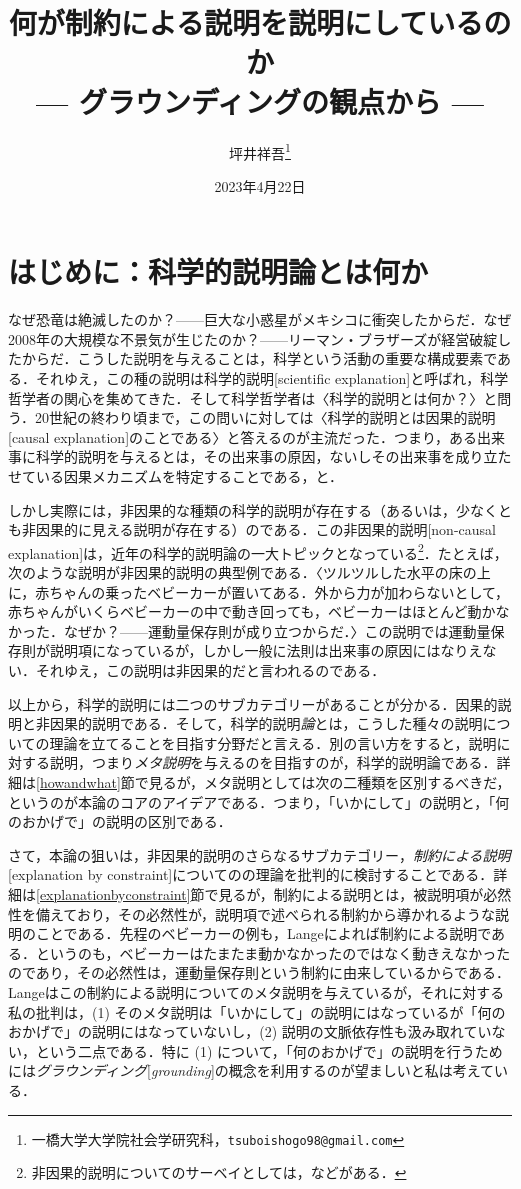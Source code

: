 \documentclass[dvipdfmx,twoside,11pt,uplatex]{jsarticle}
\title{何が制約による説明を説明にしているのか
\large{\\--- グラウンディングの観点から ---}
}
\author{坪井祥吾\thanks{一橋大学大学院社会学研究科，\texttt{tsuboishogo98@gmail.com}}}
\date{2023年4月22日}
\newcommand{\myterm}[2]{{\emph{#1}}{[\emph{#2}]}}
\theoremstyle{definition}
\begin{document}
\maketitle

\section{はじめに：科学的説明論とは何か}
なぜ恐竜は絶滅したのか？——巨大な小惑星がメキシコに衝突したからだ．なぜ2008年の大規模な不景気が生じたのか？——リーマン・ブラザーズが経営破綻したからだ．こうした説明を与えることは，科学という活動の重要な構成要素である．それゆえ，この種の説明は科学的説明[scientific explanation]と呼ばれ，科学哲学者の関心を集めてきた．そして科学哲学者は〈科学的説明とは何か？〉と問う．20世紀の終わり頃まで，この問いに対しては〈科学的説明とは因果的説明[causal explanation]のことである〉と答えるのが主流だった．つまり，ある出来事に科学的説明を与えるとは，その出来事の原因，ないしその出来事を成り立たせている因果メカニズムを特定することである，と．

しかし実際には，非因果的な種類の科学的説明が存在する（あるいは，少なくとも非因果的に見える説明が存在する）のである．この非因果的説明[non-causal explanation]は，近年の科学的説明論の一大トピックとなっている\footnote{
非因果的説明についてのサーベイとしては，\cite{kobayashietal2021noncausal,reutlinger2017ebc}などがある．
}．たとえば，次のような説明が非因果的説明の典型例である．〈ツルツルした水平の床の上に，赤ちゃんの乗ったベビーカーが置いてある．外から力が加わらないとして，赤ちゃんがいくらベビーカーの中で動き回っても，ベビーカーはほとんど動かなかった．なぜか？——運動量保存則が成り立つからだ．〉この説明では運動量保存則が説明項になっているが，しかし一般に法則は出来事の原因にはなりえない．それゆえ，この説明は非因果的だと言われるのである．

以上から，科学的説明には二つのサブカテゴリーがあることが分かる．因果的説明と非因果的説明である．そして，科学的説明\emph{論}とは，こうした種々の説明についての理論を立てることを目指す分野だと言える．別の言い方をすると，説明に対する説明，つまり\emph{メタ説明}を与えるのを目指すのが，科学的説明論である．詳細は\ref{howandwhat}節で見るが，メタ説明としては次の二種類を区別するべきだ，というのが本論のコアのアイデアである．つまり，「いかにして」の説明と，「何のおかげで」の説明の区別である．

さて，本論の狙いは，非因果的説明のさらなるサブカテゴリー，\emph{制約による説明}[explanation by constraint]についての\cite{Lange2011,Lange2013a,Lange2016,Lange2018b}の理論を批判的に検討することである．詳細は\ref{explanationbyconstraint}節で見るが，制約による説明とは，被説明項が必然性を備えており，その必然性が，説明項で述べられる制約から導かれるような説明のことである．先程のベビーカーの例も，Langeによれば制約による説明である．というのも，ベビーカーはたまたま動かなかったのではなく動きえなかったのであり，その必然性は，運動量保存則という制約に由来しているからである．Langeはこの制約による説明についてのメタ説明を与えているが，それに対する私の批判は，(1) そのメタ説明は「いかにして」の説明にはなっているが「何のおかげで」の説明にはなっていないし，(2) 説明の文脈依存性も汲み取れていない，という二点である．特に (1) について，「何のおかげで」の説明を行うためには\myterm{グラウンディング}{grounding}の概念を利用するのが望ましいと私は考えている．
\end{document}
